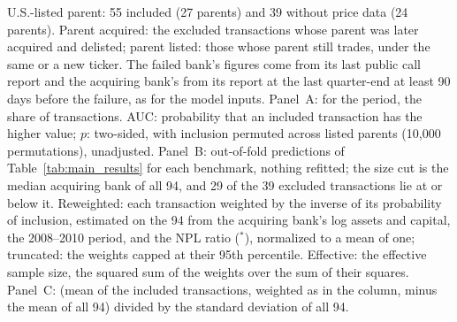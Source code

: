 \begin{table}[!t]
{U.S.-listed parent: 55 included (27 parents) and 39 without price data (24 parents). Parent acquired:
the excluded transactions whose parent was later acquired and delisted; parent listed: those whose parent still trades, under the
same or a new ticker. The failed
bank's figures come from its last public call report and the acquiring bank's from its report at the last quarter-end at least
90 days before the failure, as for the model inputs. Panel~A: for the period, the share of transactions. AUC: probability that an
included transaction has the higher value; $p$: two-sided, with inclusion permuted across listed parents (10,000
permutations), unadjusted. Panel~B: out-of-fold predictions of Table~\ref{tab:main_results} for each benchmark, nothing refitted;
the size cut is the median acquiring bank of all 94, and 29 of the 39 excluded transactions
lie at or below it. Reweighted: each transaction weighted by the inverse of its probability of inclusion, estimated on the 94 from the
acquiring bank's log assets and capital, the 2008--2010 period, and the NPL ratio ($^{*}$), normalized to a mean of one; truncated: the
weights capped at their 95th percentile. Effective: the effective sample size, the squared sum of the weights over the sum of their
squares. Panel~C: (mean of the included transactions, weighted as in the column, minus the mean of all 94) divided by the standard
deviation of all 94.}
\end{table}
